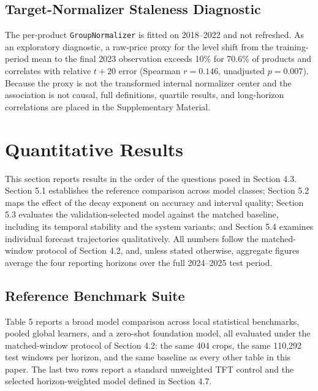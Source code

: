 \documentclass[review,3p,times]{elsarticle}
\begin{document}
\subsection{Target-Normalizer Staleness Diagnostic}

The per-product \texttt{GroupNormalizer} is fitted on 2018--2022 and not refreshed. As an exploratory diagnostic, a raw-price proxy for the level shift from the training-period mean to the final 2023 observation exceeds 10\% for 70.6\% of products and correlates with relative $t+20$ error (Spearman $r=0.146$, unadjusted $p=0.007$). Because the proxy is not the transformed internal normalizer center and the association is not causal, full definitions, quartile results, and long-horizon correlations are placed in the Supplementary Material.



\section{Quantitative Results}

This section reports results in the order of the questions posed in Section 4.3. Section 5.1 establishes the reference comparison across model classes; Section 5.2 maps the effect of the decay exponent on accuracy and interval quality; Section 5.3 evaluates the validation-selected model against the matched baseline, including its temporal stability and the system variants; and Section 5.4 examines individual forecast trajectories qualitatively. All numbers follow the matched-window protocol of Section 4.2, and, unless stated otherwise, aggregate figures average the four reporting horizons over the full 2024--2025 test period.

\subsection{Reference Benchmark Suite}

Table 5 reports a broad model comparison across local statistical benchmarks, pooled global learners, and a zero-shot foundation model, all evaluated under the matched-window protocol of Section 4.2: the same 404 crops, the same 110,292 test windows per horizon, and the same baseline as every other table in this paper. The last two rows report a standard unweighted TFT control and the selected horizon-weighted model defined in Section 4.7.
\end{document}
